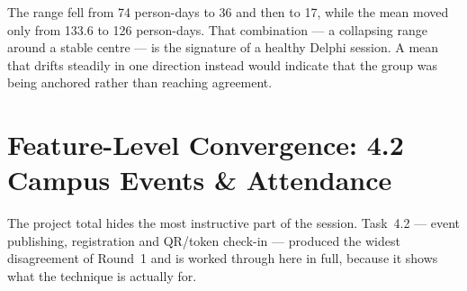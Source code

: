 \documentclass[11pt,a4paper]{report}
\begin{document}
The range fell from 74 person-days to 36 and then to 17, while the mean moved only from 133.6 to 126 person-days.
That combination --- a collapsing range around a stable centre --- is the signature
of a healthy Delphi session. A mean that drifts steadily in one direction instead
would indicate that the group was being anchored rather than reaching agreement.


\section{Feature-Level Convergence: 4.2 Campus Events \& Attendance}

The project total hides the most instructive part of the session. Task~4.2 ---
event publishing, registration and QR/token check-in --- produced the widest
disagreement of Round~1 and is worked through here in full, because it shows what
the technique is actually for.
\end{document}
